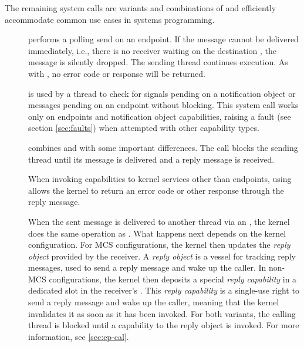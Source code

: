 
The remaining system calls are variants and combinations of
 and  efficiently
accommodate common use cases in systems programming.

\begin{description}
    \item[] performs a polling send on an
    endpoint.  If the message cannot be delivered immediately, i.e., there is no
    receiver waiting on the destination , the message is silently
    dropped.  The sending thread continues execution.  As with
    , no error code or response will be returned.

    \item[] is used by a thread to check for
    signals pending on a notification object or messages pending on an endpoint
    without blocking.  This system call works only on endpoints and notification
    object capabilities, raising a fault (see section \ref{sec:faults}) when
    attempted with other capability types.

    \item[] combines
     and  with
    some important differences.  The call blocks the sending thread until its
    message is delivered and a reply message is received.

    When invoking capabilities to kernel services other than endpoints, using
     allows the kernel to return an error code or
    other response through the reply message.

    When the sent message is delivered to another thread via an ,
    the kernel does the same operation as .  What
    happens next depends on the kernel configuration.  For MCS configurations,
    the kernel then updates the \emph{reply object} provided by the receiver.  A
    \emph{reply object} is a vessel for tracking reply messages, used to send
    a reply message and wake up the caller.  In non-MCS configurations, the
    kernel then deposits a special \emph{reply capability} in a dedicated slot
    in the receiver's .  This \emph{reply capability} is a single-use
    right to send a reply message and wake up the caller, meaning that the
    kernel invalidates it as soon as it has been invoked.  For both variants,
    the calling thread is blocked until a capability to the reply object is
    invoked.  For more information, see \autoref{sec:ep-cal}.


\end{description}
